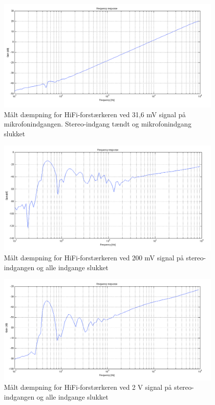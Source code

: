 \begin{figure}[h]
\centering
\includegraphics[width=\textwidth]{maalerapporter/final/daempning/final_daempning_mic_31,6mv_stereoon.png}
\caption{Målt dæmpning for HiFi-forstærkeren ved 31,6 mV signal på mikrofonindgangen. Stereo-indgang tændt og mikrofonindgang slukket}
\label{maalerapport_final12}
\end{figure}

\begin{figure}[h]
\centering
\includegraphics[width=\textwidth]{maalerapporter/final/daempning/final_daempning_stereo_200mv_alloff.png}
\caption{Målt dæmpning for HiFi-forstærkeren ved 200 mV signal på stereo-indgangen og alle indgange slukket}
\label{maalerapport_final13}
\end{figure}

\begin{figure}[h]
\centering
\includegraphics[width=\textwidth]{maalerapporter/final/daempning/final_daempning_stereo_2v_alloff.png}
\caption{Målt dæmpning for HiFi-forstærkeren ved 2 V signal på stereo-indgangen og alle indgange slukket}
\label{maalerapport_final14}
\end{figure}

